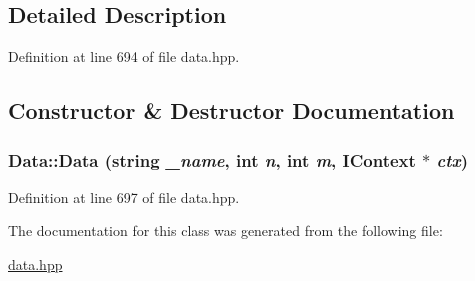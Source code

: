 \subsection{Detailed Description}


Definition at line 694 of file data.hpp.

\subsection{Constructor \& Destructor Documentation}
\hypertarget{class_data_aabf63a655ba3324cf903784cd80a0124}{
\subsubsection[{Data}]{\setlength{\rightskip}{0pt plus 5cm}Data::Data (string {\em \_\-name}, \/  int {\em n}, \/  int {\em m}, \/  {\bf IContext} $\ast$ {\em ctx})}}
\label{class_data_aabf63a655ba3324cf903784cd80a0124}


Definition at line 697 of file data.hpp.

The documentation for this class was generated from the following file:\begin{DoxyCompactItemize}
\item 
\hyperlink{data_8hpp}{data.hpp}\end{DoxyCompactItemize}
